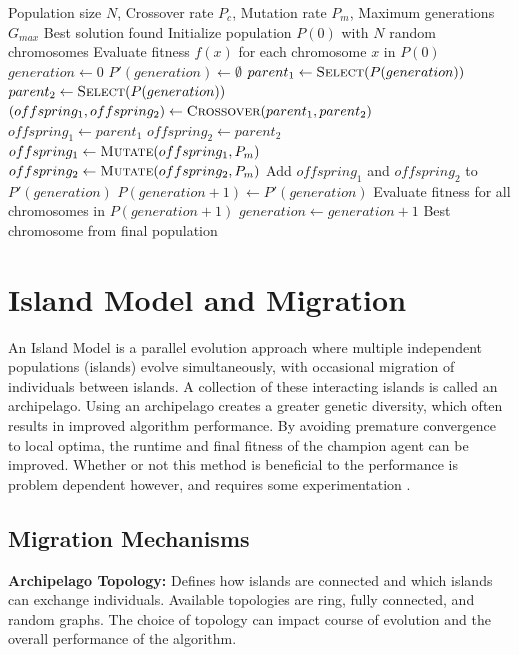 \begin{algorithm}
    \caption{Simple Genetic Algorithm}
    \begin{algorithmic}[1]
        \Require Population size $N$, Crossover rate $P_c$, Mutation rate $P_m$, Maximum generations $G_{max}$
        \Ensure Best solution found
        \State Initialize population $P(0)$ with $N$ random chromosomes
        \State Evaluate fitness $f(x)$ for each chromosome $x$ in $P(0)$
        \State $generation \gets 0$
        \State $P'(generation) \gets \emptyset$ 
        \State $parent_1 \gets \Call{Select}{P(generation)}$
        \State $parent_2 \gets \Call{Select}{P(generation)}$
        \State $(offspring_1, offspring_2) \gets \Call{Crossover}{parent_1, parent_2}$
        \Else
        \State $offspring_1 \gets parent_1$
        \State $offspring_2 \gets parent_2$
        \EndIf
        \State $offspring_1 \gets \Call{Mutate}{offspring_1, P_m}$
        \State $offspring_2 \gets \Call{Mutate}{offspring_2, P_m}$
        \State Add $offspring_1$ and $offspring_2$ to $P'(generation)$
        \EndWhile
        \State $P(generation+1) \gets P'(generation)$
        \State Evaluate fitness for all chromosomes in $P(generation+1)$
        \State $generation \gets generation + 1$
        \EndWhile
        \State \Return Best chromosome from final population
    \end{algorithmic}
\end{algorithm}

\section{Island Model and Migration}
An Island Model is a parallel evolution approach where multiple independent populations (islands) evolve simultaneously, with occasional migration of individuals between islands. A collection of these interacting islands is called an archipelago. Using an archipelago creates a greater genetic diversity, which often results in improved algorithm performance. By avoiding premature convergence to local optima, the runtime and final fitness of the champion agent can be improved. Whether or not this method is beneficial to the performance is problem dependent however, and requires some experimentation \parencite{whitley1999island}. 

\subsection{Migration Mechanisms}
\textbf{Archipelago Topology:} Defines how islands are connected and which islands can exchange individuals. Available topologies are ring, fully connected, and random graphs. The choice of topology can impact course of evolution and the overall performance of the algorithm.

